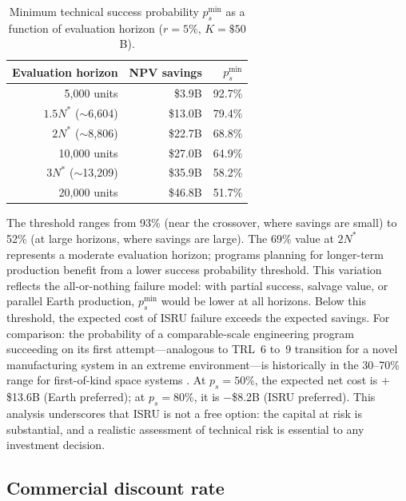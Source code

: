 \documentclass[preprint,12pt]{elsarticle}
\begin{document}
\begin{table}[htbp]
\centering
\caption{Minimum technical success probability $p_s^{\min}$ as a function of evaluation horizon ($r = 5\%$, $K = \$50$B).}
\label{tab:ps_horizon}
\small
\begin{tabular}{@{}rrr@{}}
\toprule
Evaluation horizon & NPV savings & $p_s^{\min}$ \\
\midrule
5{,}000 units            & \$3.9B   & 92.7\% \\
$1.5 N^*$ ($\sim$6{,}604) & \$13.0B  & 79.4\% \\
$2 N^*$ ($\sim$8{,}806)   & \$22.7B  & 68.8\% \\
10{,}000 units           & \$27.0B  & 64.9\% \\
$3 N^*$ ($\sim$13{,}209)  & \$35.9B  & 58.2\% \\
20{,}000 units           & \$46.8B  & 51.7\% \\
\bottomrule
\end{tabular}
\end{table}

The threshold ranges from 93\% (near the crossover, where savings are small) to 52\% (at large horizons, where savings are large). The 69\% value at $2N^*$ represents a moderate evaluation horizon; programs planning for longer-term production benefit from a lower success probability threshold. This variation reflects the all-or-nothing failure model: with partial success, salvage value, or parallel Earth production, $p_s^{\min}$ would be lower at all horizons. Below this threshold, the expected cost of ISRU failure exceeds the expected savings. For comparison: the probability of a comparable-scale engineering program succeeding on its first attempt---analogous to TRL~6 to~9 transition for a novel manufacturing system in an extreme environment---is historically in the 30--70\% range for first-of-kind space systems \cite{wertz2011}. At $p_s = 50\%$, the expected net cost is $+$\$13.6B (Earth preferred); at $p_s = 80\%$, it is $-$\$8.2B (ISRU preferred). This analysis underscores that ISRU is not a free option: the capital at risk is substantial, and a realistic assessment of technical risk is essential to any investment decision.

\subsection{Commercial discount rate}
\label{sec:commercial_rate}
\end{document}
